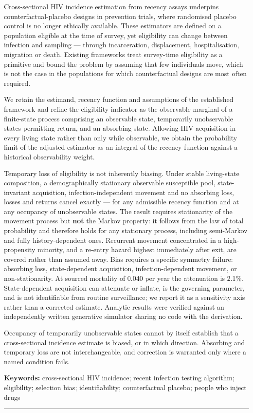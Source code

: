 Cross-sectional HIV incidence estimation from recency assays underpins counterfactual-placebo designs in prevention trials, where randomised placebo control is no longer ethically available. These estimators are defined on a population eligible at the time of survey, yet eligibility can change between infection and sampling --- through incarceration, displacement, hospitalisation, migration or death. Existing frameworks treat survey-time eligibility as a primitive and bound the problem by assuming that few individuals move, which is not the case in the populations for which counterfactual designs are most often required.

We retain the estimand, recency function and assumptions of the established framework and refine the eligibility indicator as the observable marginal of a finite-state process comprising an observable state, temporarily unobservable states permitting return, and an absorbing state. Allowing HIV acquisition in every living state rather than only while observable, we obtain the probability limit of the adjusted estimator as an integral of the recency function against a historical observability weight.

Temporary loss of eligibility is not inherently biasing. Under stable living-state composition, a demographically stationary observable susceptible pool, state-invariant acquisition, infection-independent movement and no absorbing loss, losses and returns cancel exactly --- for any admissible recency function and at any occupancy of unobservable states. The result requires stationarity of the movement process but \textbf{not} the Markov property: it follows from the law of total probability and therefore holds for any stationary process, including semi-Markov and fully history-dependent ones. Recurrent movement concentrated in a high-propensity minority, and a re-entry hazard highest immediately after exit, are covered rather than assumed away. Bias requires a specific symmetry failure: absorbing loss, state-dependent acquisition, infection-dependent movement, or non-stationarity. At sourced mortality of 0.040 per year the attenuation is 2.1\%. State-dependent acquisition can attenuate or inflate, is the governing parameter, and is not identifiable from routine surveillance; we report it as a sensitivity axis rather than a corrected estimate. Analytic results were verified against an independently written generative simulator sharing no code with the derivation.

Occupancy of temporarily unobservable states cannot by itself establish that a cross-sectional incidence estimate is biased, or in which direction. Absorbing and temporary loss are not interchangeable, and correction is warranted only where a named condition fails.

\textbf{Keywords:} cross-sectional HIV incidence; recent infection testing algorithm; eligibility; selection bias; identifiability; counterfactual placebo; people who inject drugs

\begin{center}\rule{0.5\linewidth}{0.5pt}\end{center}
